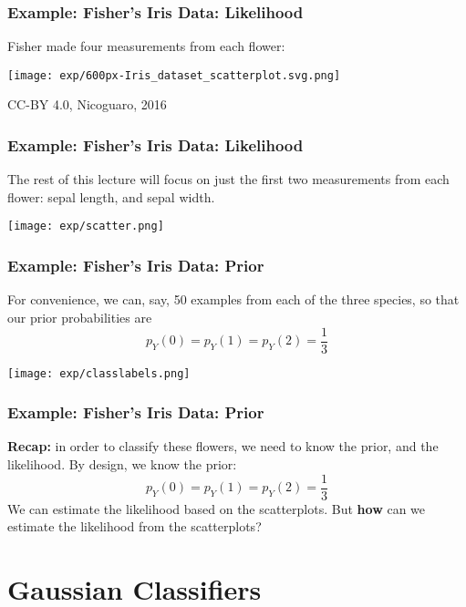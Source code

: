 \documentclass{beamer}
\begin{document}
\begin{frame}
  \frametitle{Example: Fisher's Iris Data: Likelihood}

  Fisher made four measurements from each flower:
  \centerline{\texttt{[image: exp/600px-Iris\_dataset\_scatterplot.svg.png]}}
  {\tiny CC-BY 4.0, Nicoguaro, 2016}
    
\end{frame}

\begin{frame}
  \frametitle{Example: Fisher's Iris Data: Likelihood}

  The rest of this lecture will focus on just the first two
  measurements from each flower: sepal length, and sepal width.
  \centerline{\texttt{[image: exp/scatter.png]}}
    
\end{frame}

\begin{frame}
  \frametitle{Example: Fisher's Iris Data: Prior}

  For convenience, we can, say, 50 examples from each of the three
  species, so that our prior probabilities are
  \[
  p_Y(0) = p_Y(1) = p_Y(2) = \frac{1}{3}
  \]
  \centerline{\texttt{[image: exp/classlabels.png]}}
\end{frame}

\begin{frame}
  \frametitle{Example: Fisher's Iris Data: Prior}

  {\bf Recap:} in order to classify these flowers, we need to know the
  prior, and the likelihood.  By design, we know the prior:
  \[
  p_Y(0) = p_Y(1) = p_Y(2) = \frac{1}{3}
  \]
  We can estimate the likelihood based on the scatterplots.  But {\bf
    how} can we estimate the likelihood from the scatterplots?
\end{frame}

\section[Gaussian]{Gaussian Classifiers}
\setcounter{subsection}{1}
\end{document}
